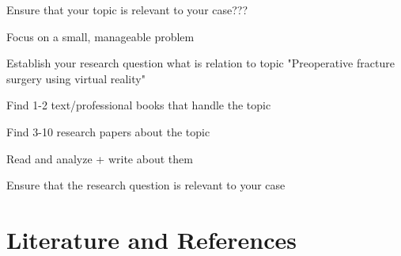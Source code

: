 \documentclass[11pt]{article}
\begin{document}
Ensure that your topic is relevant to your case???

Focus on a small, manageable problem

Establish your research question
what is relation to topic
"Preoperative fracture surgery using virtual reality"

Find 1-2 text/professional books that handle the topic

Find 3-10 research papers about the topic

Read and analyze + write about them

Ensure that the research question is relevant to your case


\section{Literature and References}


\printbibliography
\end{document}
